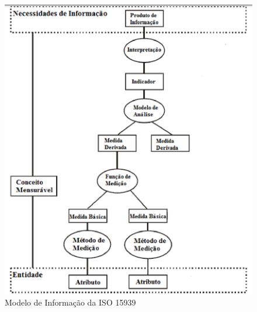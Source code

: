 	\begin{figure}[h]
		\centering
		
			\includegraphics[keepaspectratio=true,scale=0.7]{figuras/modelodeinformacao15939.eps}
		\caption{Modelo de Informação da ISO 15939}
		\label{informacao}
	\end{figure}

